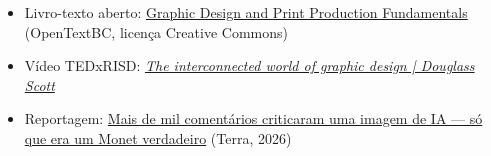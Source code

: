 \documentclass[a4paper,12pt]{article}
\begin{document}
\begin{itemize}[nosep]
  \item Livro-texto aberto: \href{https://opentextbc.ca/graphicdesign/}{Graphic Design and Print Production Fundamentals} (OpenTextBC, licença Creative Commons)
  \item Vídeo TEDxRISD: \href{https://www.youtube.com/watch?v=UYhBYu_yauU}{\textit{The interconnected world of graphic design | Douglass Scott}}
  \item Reportagem: \href{https://www.terra.com.br/byte/mais-de-mil-comentarios-criticaram-uma-imagem-de-ia-so-que-era-um-monet-verdadeiro,83718b3ea5d626e0ccf59ee5233b3f8738uffiw1.html}{Mais de mil comentários criticaram uma imagem de IA --- só que era um Monet verdadeiro} (Terra, 2026)
\end{itemize}

\end{document}
